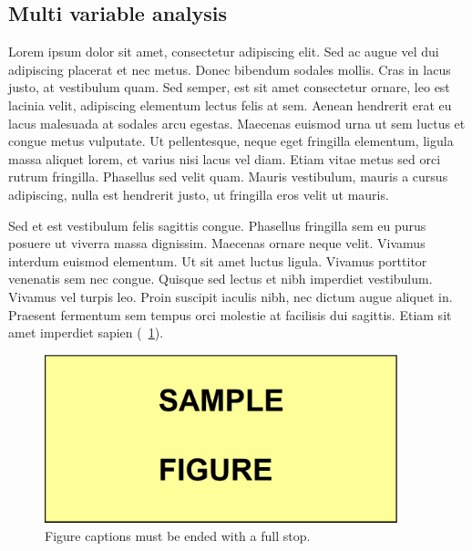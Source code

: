 \subsection{Multi variable analysis}

Lorem ipsum dolor sit amet, consectetur adipiscing elit. Sed ac augue vel dui  adipiscing placerat et nec metus. Donec bibendum sodales mollis. Cras in lacus 
justo, at vestibulum quam. Sed semper, est sit amet consectetur ornare, leo est  lacinia velit, adipiscing elementum lectus felis at sem. Aenean hendrerit erat eu 
lacus malesuada at sodales arcu egestas. Maecenas euismod urna ut sem luctus et  congue metus vulputate. Ut pellentesque, neque eget fringilla elementum, ligula 
massa aliquet lorem, et varius nisi lacus vel diam. Etiam vitae metus sed orci  rutrum fringilla. Phasellus sed velit quam. Mauris vestibulum, mauris a cursus  adipiscing, nulla est hendrerit justo, ut fringilla eros velit ut mauris.
 
Sed et est vestibulum felis sagittis congue. Phasellus fringilla sem eu purus  posuere ut viverra massa dignissim. Maecenas ornare neque velit. Vivamus interdum  euismod elementum. Ut sit amet luctus ligula. Vivamus porttitor venenatis sem nec  congue. Quisque sed lectus et nibh imperdiet vestibulum. Vivamus vel turpis leo.  Proin suscipit iaculis nibh, nec dictum augue aliquet in. Praesent fermentum sem  tempus orci molestie at facilisis dui sagittis. Etiam sit amet imperdiet sapien (\figurename\ \ref{fig:ch3-3}).

\vspace{6pt} %
\begin{figure}[!ht]
 \centering
 \includegraphics[width=290pt,keepaspectratio=true]{./fig/sekil4}
 \caption{Figure captions must be ended with a full stop.}
 \label{fig:ch3-3}
\end{figure}
\vspace{-9pt} %


